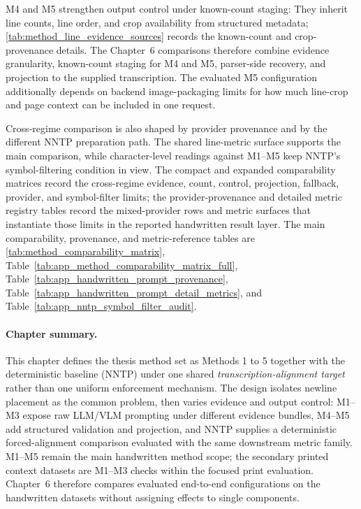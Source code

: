 M4 and M5 strengthen output control under known-count staging: They inherit line counts, line order, and crop availability from structured metadata; \autoref{tab:method_line_evidence_sources} records the known-count and crop-provenance details. The Chapter~6 comparisons therefore combine evidence granularity, known-count staging for M4 and M5, parser-side recovery, and projection to the supplied transcription. The evaluated M5 configuration additionally depends on backend image-packaging limits for how much line-crop and page context can be included in one request.

Cross-regime comparison is also shaped by provider provenance and by the different NNTP preparation path. The shared line-metric surface supports the main comparison, while character-level readings against M1--M5 keep NNTP's symbol-filtering condition in view. The compact and expanded comparability matrices record the cross-regime evidence, count, control, projection, fallback, provider, and symbol-filter limits; the provider-provenance and detailed metric registry tables record the mixed-provider rows and metric surfaces that instantiate those limits in the reported handwritten result layer. The main comparability, provenance, and metric-reference tables are \autoref{tab:method_comparability_matrix}, Table~\ref{tab:app_method_comparability_matrix_full}, Table~\ref{tab:app_handwritten_prompt_provenance}, Table~\ref{tab:app_handwritten_prompt_detail_metrics}, and Table~\ref{tab:app_nntp_symbol_filter_audit}.

\paragraph{Chapter summary.}
\label{sec:method_summary}

This chapter defines the thesis method set as Methods 1 to 5 together with the deterministic baseline (NNTP) under one shared \emph{transcription-alignment target} rather than one uniform enforcement mechanism. The design isolates newline placement as the common problem, then varies evidence and output control: M1--M3 expose raw LLM/VLM prompting under different evidence bundles, M4--M5 add structured validation and projection, and NNTP supplies a deterministic forced-alignment comparison evaluated with the same downstream metric family. M1--M5 remain the main handwritten method scope; the secondary printed context datasets are M1--M3 checks within the focused print evaluation. Chapter~6 therefore compares evaluated end-to-end configurations on the handwritten datasets without assigning effects to single components.
